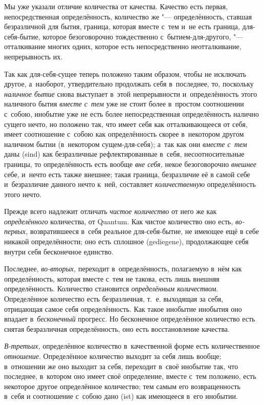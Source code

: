 Мы уже указали отличие количества от качества. Качество есть первая,
непосредственная определённость, количество же "--- определённость, ставшая
безразличной для бытия, граница, которая вместе с~тем и~не есть граница,
для-себя-бытие, которое безоговорочно тождественно с~бытием-для-другого,
"--- отталкивание многих одних, которое есть непосредственно
неотталкивание, непрерывность их.

Так как для-себя-сущее теперь положено таким образом, чтобы не исключать
другое, а~наоборот, утвердительно продолжать себя в~последнее, то, поскольку
{\em наличное бытие} снова выступает в~этой непрерывности и~определённость
этого наличного бытия {\em вместе с~тем} уже не стоит более в~простом
соотношении с~собою, инобытие уже не есть более непосредственная определённость
налично сущего нечто, но положено так, что имеет себя как отталкивающееся от
себя, имеет соотношение с~собою как определённость скорее в~некотором другом
наличном бытии (в~некотором сущем-для-себя); а~так как они {\em вместе с~тем}
даны (sind) как безразличные рефлектированные в~себя, несоотносительные
границы, то определённость есть вообще {\em вне себя,} некое безоговорочно
{\em внешнее} себе, и~нечто есть также внешнее; такая граница, безразличие её
в самой себе и~безразличие данного нечто к~ней, составляет {\em количественную}
определённость этого нечто.

Прежде всего надлежит отличать {\em чистое количество} от него же как
{\em определённого} количества, от Quantum. Как чистое количество оно есть,
{\em во-первых,} возвратившееся в~себя реальное для-себя-бытие, не имеющее ещё
в себе никакой определённости; оно есть сплошное (gediegene), продолжающее себя
внутри себя бесконечное единство.

Последнее, {\em во-вторых,} переходит в~определённость, полагаемую в~нём как
определённость, которая вместе с~тем не такова, есть лишь внешняя
определённость. Количество становится {\em определённым количеством}.
Определённое количество есть безразличная, т.~е. выходящая за себя, отрицающая
самое себя определённость. Как такое инобытие инобытия оно впадает
в~{\em бесконечный} прогресс. Но бесконечное определённое количество есть
снятая безразличная определённость, оно есть восстановление качества.

{\em В-третьих,} определённое количество в~качественной форме есть
количественное {\em отношение}. Определённое количество выходит за себя лишь
вообще; в~отношении же оно выходит за себя, переходит в~своё инобытие так, что
последнее, в~котором оно имеет своё определение, вместе с~тем положено, есть
некоторое другое определённое количество; тем самым его возвращенность в~себя
и соотношение с~собою дано (ist) как имеющееся в~его инобытии.

